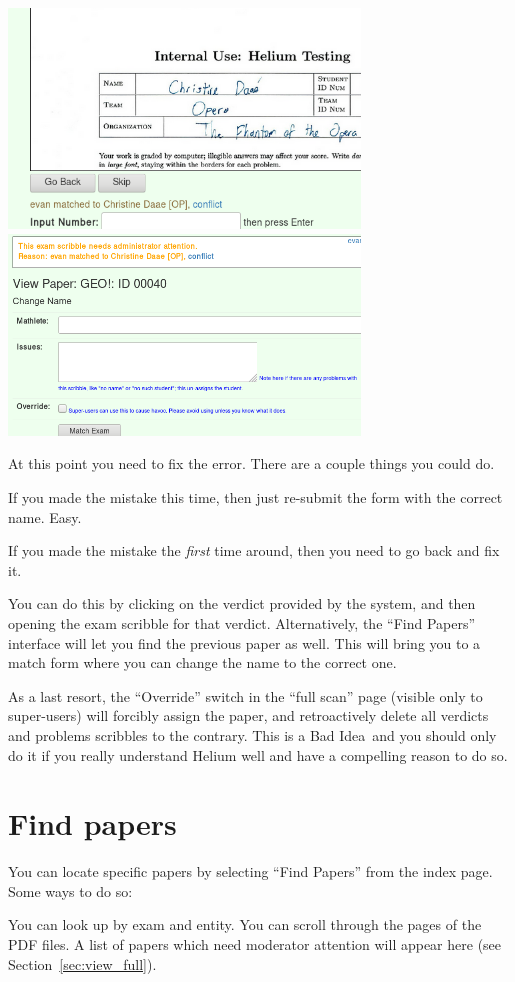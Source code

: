 \begin{center}
	\includegraphics[width=0.7\textwidth]{images/conflict3.png}
	\includegraphics[width=0.7\textwidth]{images/conflict2.png}
\end{center}

At this point you need to fix the error.
There are a couple things you could do.
\begin{itemize}
	\ii If you made the mistake this time,
	then just re-submit the form with the correct name. Easy.

	\ii If you made the mistake the \emph{first} time around,
	then you need to go back and fix it.

	You can do this by clicking on the verdict provided by the system,
	and then opening the exam scribble for that verdict.
	Alternatively, the ``Find Papers'' interface will let you find
	the previous paper as well.
	This will bring you to a match form where you can change the
	name to the correct one.

	\ii As a last resort,
	the ``Override'' switch in the ``full scan'' page (visible only to super-users)
	will forcibly assign the paper,
	and retroactively delete all verdicts and
	problems scribbles to the contrary.
	This is a Bad Idea\texttrademark\ and you should only do it
	if you really understand Helium well and have a compelling reason to do so.
\end{itemize}

\section{Find papers}
You can locate specific papers
by selecting ``Find Papers'' from the index page.
Some ways to do so:
\begin{itemize}
	\ii You can look up by exam and entity.
	\ii You can scroll through the pages of the PDF files.
	\ii A list of papers which need moderator attention
	will appear here (see Section~\ref{sec:view_full}).
\end{itemize}

